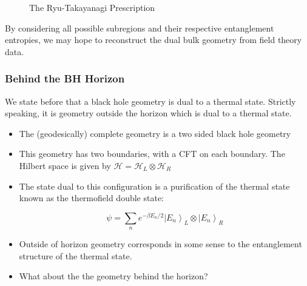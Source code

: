 \documentclass[8pt,aspectratio=169]{beamer}
\newcommand{\ket}[1]{\left| #1 \right>}
\begin{document}
\begin{frame}
\begin{minipage}[t]{0.44\linewidth}
\begin{figure}
\begin{center}
    \end{center}
    \caption{The Ryu-Takayanagi Prescription}
    \label{fig:WDW}
\end{figure}

\end{minipage}

By considering all possible subregions and their respective entanglement entropies, we may hope to reconstruct the dual bulk geometry from field theory data.

\end{frame}

\begin{frame}
\frametitle{Behind the BH Horizon}

We state before that a black hole geometry is dual to a thermal state. Strictly speaking, it is geometry outside the horizon which is dual to a thermal state.

\begin{minipage}[t]{0.55\linewidth}

\begin{itemize}

\item The (geodesically) complete geometry is a two sided black hole geometry

\item This geometry has two boundaries, with a CFT  on each boundary. The Hilbert space is given by $\mathcal{H} = \mathcal{H}_L \otimes \mathcal{H}_R$

\item The state dual to this configuration is a purification of the thermal state known as the thermofield double state: 

$$\psi = \displaystyle\sum_n e^{- \beta E_n /2} \ket{E_n}_L \otimes \ket{E_n}_R$$

\item Outside of horizon geometry corresponds in some sense to the entanglement structure of the thermal state.

\item What about the the geometry behind the horizon?

\end{itemize}

\end{minipage}\hfill
%
\begin{minipage}[t]{0.44\linewidth}

\begin{figure}
    \begin{center}
    

\end{center}
\end{figure}
\end{minipage}
\end{frame}
\end{document}
